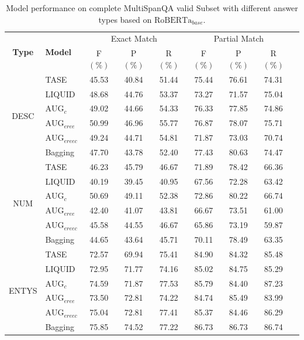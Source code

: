 \documentclass[a4paper,fleqn]{cas-dc}
\newcommand{\1}[1]{\mathds{1}\left[#1\right]}
\begin{document}
	\begin{table}[ht]
		\caption{Model performance on complete MultiSpanQA valid Subset with different answer types based on $\text{RoBERTa}_{base}$.}
		\label{tab:robertasub}
		\begin{tabular*}{\textwidth}{cp{1.5cm}ccccccc}
			\toprule
			\multirow{2}{*}{\textbf{Type}} & \multirow{2}{*}{\textbf{Model}} & \multicolumn{3}{c}{Exact Match} & \multicolumn{3}{c}{Partial Match} \\
			\cmidrule{3-8} 
			& & F\((\%)\) & P\((\%)\) & R\((\%)\) & F\((\%)\) & P\((\%)\) & R\((\%)\) \\
			\midrule
			\multirow{6}{*}{DESC} & TASE & 45.53 & 40.84 & 51.44 & 75.44 & 76.61 & 74.31 \\ 
			& LIQUID & 48.68 & 44.76 & 53.37 & 73.27 & 71.57 & 75.04 \\
			& $\text{AUG}_{c}$ & 49.02 & 44.66 & 54.33 & 76.33 & 77.85 & 74.86 \\
			& $\text{AUG}_{eree}$ & 50.99 & 46.96 & 55.77 & 76.87 & 78.07 & 75.71 \\
			& $\text{AUG}_{ereec}$ & 49.24 & 44.71 & 54.81 & 71.87 & 73.03 & 70.74 \\
			& Bagging & 47.70 & 43.78 & 52.40 & 77.43 & 80.63 & 74.47 \\
			\midrule
			\multirow{6}{*}{NUM} & TASE & 46.23 & 45.79 & 46.67 & 71.89 & 78.42 & 66.36 \\ 
			& LIQUID & 40.19 & 39.45 & 40.95 & 67.56 & 72.28 & 63.42 \\
			& $\text{AUG}_{c}$ & 50.69 & 49.11 & 52.38 & 72.86 & 80.22 & 66.74 \\
			& $\text{AUG}_{eree}$ & 42.40 & 41.07 & 43.81 & 66.67 & 73.51 & 61.00 \\
			& $\text{AUG}_{ereec}$ & 45.58 & 44.55 & 46.67 & 65.86 & 73.19 & 59.87 \\
			& Bagging & 44.65 & 43.64 & 45.71 & 70.11 & 78.49 & 63.35 \\
			\midrule
			\multirow{6}{*}{ENTYS} & TASE & 72.57 & 69.94 & 75.41 & 84.90 & 84.32 & 85.48 \\ 
			& LIQUID & 72.95 & 71.77 & 74.16 & 85.02 & 84.75 & 85.29 \\
			& $\text{AUG}_{c}$ & 74.59 & 71.87 & 77.53 & 85.79 & 84.40 & 87.23 \\
			& $\text{AUG}_{eree}$ & 73.50 & 72.81 & 74.22 & 84.74 & 85.49 & 83.99 \\
			& $\text{AUG}_{ereec}$ & 75.04 & 72.81 & 77.41 & 85.37 & 84.46 & 86.29 \\
			& Bagging & 75.85 & 74.52 & 77.22 & 86.73 & 86.73 & 86.74 \\
			\bottomrule
		\end{tabular*}
	\end{table}
\end{document}
